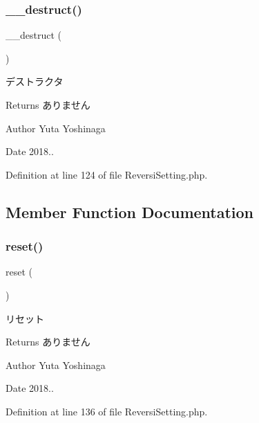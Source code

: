 \subsubsection{\texorpdfstring{\+\_\+\+\_\+destruct()}{\_\_destruct()}}
{\footnotesize\ttfamily \+\_\+\+\_\+destruct (\begin{DoxyParamCaption}{ }\end{DoxyParamCaption})}



デストラクタ 

\begin{DoxyReturn}{Returns}
ありません 
\end{DoxyReturn}
\begin{DoxyAuthor}{Author}
Yuta Yoshinaga 
\end{DoxyAuthor}
\begin{DoxyDate}{Date}
2018.. 
\end{DoxyDate}


Definition at line 124 of file Reversi\+Setting.\+php.



\subsection{Member Function Documentation}
\mbox{\label{class_reversi_setting_a4a20559544fdf4dcb457e258dc976cf8}} 
\subsubsection{\texorpdfstring{reset()}{reset()}}
{\footnotesize\ttfamily reset (\begin{DoxyParamCaption}{ }\end{DoxyParamCaption})}



リセット 

\begin{DoxyReturn}{Returns}
ありません 
\end{DoxyReturn}
\begin{DoxyAuthor}{Author}
Yuta Yoshinaga 
\end{DoxyAuthor}
\begin{DoxyDate}{Date}
2018.. 
\end{DoxyDate}


Definition at line 136 of file Reversi\+Setting.\+php.



